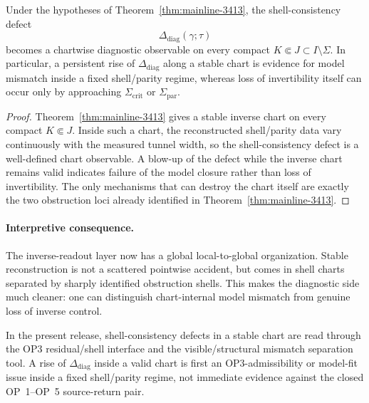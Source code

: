 \begin{corollary}
\label{cor:mainline-3413-chartwise}
Under the hypotheses of Theorem~\ref{thm:mainline-3413}, the shell-consistency defect
\[
  \Delta_{\mathrm{diag}}(\gamma;\tau)
\]
becomes a chartwise diagnostic observable on every compact $K\Subset J\subset I\setminus\Sigma$. In particular, a persistent rise of $\Delta_{\mathrm{diag}}$ along a stable chart is evidence for model mismatch inside a fixed shell/parity regime, whereas loss of invertibility itself can occur only by approaching $\Sigma_{\mathrm{crit}}$ or $\Sigma_{\mathrm{par}}$.
\end{corollary}

\begin{proof}
Theorem~\ref{thm:mainline-3413} gives a stable inverse chart on every compact $K\Subset J$. Inside such a chart, the reconstructed shell/parity data vary continuously with the measured tunnel width, so the shell-consistency defect is a well-defined chart observable. A blow-up of the defect while the inverse chart remains valid indicates failure of the model closure rather than loss of invertibility. The only mechanisms that can destroy the chart itself are exactly the two obstruction loci already identified in Theorem~\ref{thm:mainline-3413}.
\end{proof}

\paragraph{Interpretive consequence.}
The inverse-readout layer now has a global local-to-global organization. Stable reconstruction is not a scattered pointwise accident, but comes in shell charts separated by sharply identified obstruction shells. This makes the diagnostic side much cleaner: one can distinguish chart-internal model mismatch from genuine loss of inverse control.

\begin{remark}
In the present release, shell-consistency defects in a stable chart are read through the OP3 residual/shell interface and the visible/structural mismatch separation tool. A rise of $\Delta_{\mathrm{diag}}$ inside a valid chart is first an OP3-admissibility or model-fit issue inside a fixed shell/parity regime, not immediate evidence against the closed OP~1--OP~5 source-return pair.
\end{remark}

